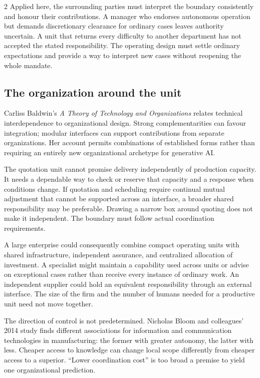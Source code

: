 \begin{multicols}{2}
Applied here, the surrounding parties must interpret the boundary
consistently and honour their contributions. A manager who endorses
autonomous operation but demands discretionary clearance for ordinary
cases leaves authority uncertain. A unit that returns every difficulty
to another department has not accepted the stated responsibility. The
operating design must settle ordinary expectations and provide a way to
interpret new cases without reopening the whole mandate.

\subsection{The organization around the
unit}\label{the-organization-around-the-unit}

Carliss Baldwin's \emph{A Theory of Technology and Organizations}
\citep{baldwin2026theory} relates technical interdependence to
organizational design. Strong complementarities can favour integration;
modular interfaces can support contributions from separate
organizations. Her account permits combinations of established forms
rather than requiring an entirely new organizational archetype for
generative AI.

The quotation unit cannot promise delivery independently of production
capacity. It needs a dependable way to check or reserve that capacity
and a response when conditions change. If quotation and scheduling
require continual mutual adjustment that cannot be supported across an
interface, a broader shared responsibility may be preferable. Drawing a
narrow box around quoting does not make it independent. The boundary
must follow actual coordination requirements.

A large enterprise could consequently combine compact operating units
with shared infrastructure, independent assurance, and centralized
allocation of investment. A specialist might maintain a capability used
across units or advise on exceptional cases rather than receive every
instance of ordinary work. An independent supplier could hold an
equivalent responsibility through an external interface. The size of the
firm and the number of humans needed for a productive unit need not move
together.

The direction of control is not predetermined. Nicholas Bloom and
colleagues' 2014 study \citep{bloom2014technology} finds different
associations for information and communication technologies in
manufacturing: the former with greater autonomy, the latter with less.
Cheaper access to knowledge can change local scope differently from
cheaper access to a superior. ``Lower coordination cost'' is too broad a
premise to yield one organizational prediction.


\end{multicols}
